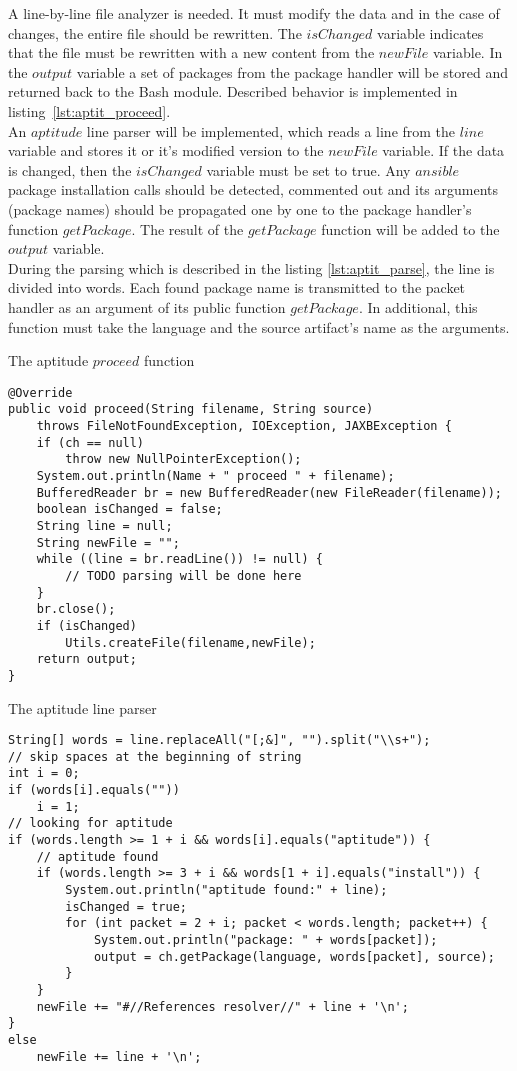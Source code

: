 A line-by-line file analyzer is needed.
It must modify the data and in the case of changes, the entire file should be rewritten.
The $isChanged$ variable indicates that the file must be rewritten with a new content from the $newFile$ variable.
In the $output$ variable a set of packages from the package handler will be stored and returned back to the Bash module.
Described behavior is implemented in listing~\ref{lst:aptit_proceed}.\\
An $aptitude$ line parser will be implemented, which reads a line from the $line$ variable and stores it or it's modified version to the $newFile$ variable.
If the data is changed, then the $isChanged$ variable must be set to true.
Any $ansible$ package installation calls should be detected, commented out and its arguments (package names) should be propagated one by one to the package handler's function $getPackage$. 
The result of the $getPackage$ function will be added to the $output$ variable.\\
During the parsing which is described in the listing \ref{lst:aptit_parse}, the line is divided into words. 
Each found package name is transmitted to the packet handler as an argument of its public function $getPackage$.
In additional, this function must take the language and the source artifact's name as the arguments.
\begin{Listing} 
\caption{The aptitude $proceed$ function}
\label{lst:aptit_proceed}
\begin{lstlisting}
@Override
public void proceed(String filename, String source)
	throws FileNotFoundException, IOException, JAXBException {
	if (ch == null)
		throw new NullPointerException();
	System.out.println(Name + " proceed " + filename);
	BufferedReader br = new BufferedReader(new FileReader(filename));
	boolean isChanged = false;
	String line = null;
	String newFile = "";
	while ((line = br.readLine()) != null) {
		// TODO parsing will be done here
	}
	br.close();
	if (isChanged)
		Utils.createFile(filename,newFile);
	return output;
}	 
\end{lstlisting}
\end{Listing} 
\begin{Listing} 
\caption{The aptitude line parser}
\label{lst:aptit_parse}
\begin{lstlisting}
String[] words = line.replaceAll("[;&]", "").split("\\s+");
// skip spaces at the beginning of string
int i = 0;
if (words[i].equals(""))
	i = 1;
// looking for aptitude 
if (words.length >= 1 + i && words[i].equals("aptitude")) {
	// aptitude found
	if (words.length >= 3 + i && words[1 + i].equals("install")) {
		System.out.println("aptitude found:" + line);
		isChanged = true;
		for (int packet = 2 + i; packet < words.length; packet++) {
			System.out.println("package: " + words[packet]);
			output = ch.getPackage(language, words[packet], source);
		}
	}
	newFile += "#//References resolver//" + line + '\n';
} 
else
	newFile += line + '\n';
\end{lstlisting}
\end{Listing} 
